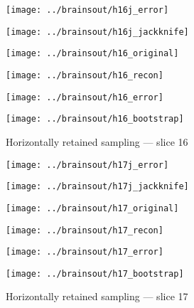 \documentclass[review,supplement,onefignum,onetabnum,juq]{siamonline181217}
\begin{document}
\begin{figure}
\begin{centering}

\parbox{\imsize}{\texttt{[image: ../brainsout/h16j\_error]}}
\parbox{\imsize}{\texttt{[image: ../brainsout/h16j\_jackknife]}}

\vspace{\vertsep}

\parbox{\imsize}{\texttt{[image: ../brainsout/h16\_original]}}
\parbox{\imsize}{\texttt{[image: ../brainsout/h16\_recon]}}

\vspace{\vertsep}

\parbox{\imsize}{\texttt{[image: ../brainsout/h16\_error]}}
\parbox{\imsize}{\texttt{[image: ../brainsout/h16\_bootstrap]}}

\end{centering}
\caption{Horizontally retained sampling --- slice 16}
\end{figure}


\begin{figure}
\begin{centering}

\parbox{\imsize}{\texttt{[image: ../brainsout/h17j\_error]}}
\parbox{\imsize}{\texttt{[image: ../brainsout/h17j\_jackknife]}}

\vspace{\vertsep}

\parbox{\imsize}{\texttt{[image: ../brainsout/h17\_original]}}
\parbox{\imsize}{\texttt{[image: ../brainsout/h17\_recon]}}

\vspace{\vertsep}

\parbox{\imsize}{\texttt{[image: ../brainsout/h17\_error]}}
\parbox{\imsize}{\texttt{[image: ../brainsout/h17\_bootstrap]}}

\end{centering}
\caption{Horizontally retained sampling --- slice 17}
\end{figure}
\end{document}
